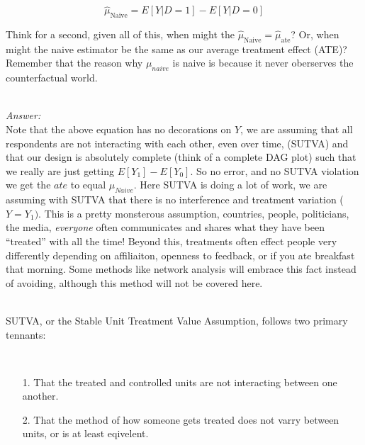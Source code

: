 \documentclass[12pt]{article}\usepackage[]{graphicx}\usepackage[]{color}
\begin{document}
\begin{flushleft}
\begin{equation}
\hat{\mu}_\text{Naive} = E[Y|D=1] - E[Y|D=0]
\end{equation}


Think for a second, given all of this, when might the $\hat{\mu}_\text{Naive} = \hat{\mu}_\text{ate}$? Or, when might the naive estimator be the same as our average treatment effect (ATE)? Remember that the reason why $\mu_{naive}$ is naive is because it never oberserves the counterfactual world.

\hfill \\

\noindent \textit{Answer:}\\

Note that the above equation has no decorations on $Y$, we are assuming that all respondents are not interacting with each other, even over time, (SUTVA) and that our design is absolutely complete (think of a complete DAG plot) such that we really are just getting $ E[Y_1] - E[Y_0]$. So no error, and no SUTVA violation we get the $ate$ to equal $\mu_{Naive}$.  Here SUTVA is doing a lot of work, we are assuming with SUTVA that there is no interference and treatment variation ($ Y = Y_1)$. This is a pretty monsterous assumption, countries, people, politicians, the media, \textit{everyone} often communicates and shares what they have been ``treated'' with all the time! Beyond this, treatments often effect people very differently depending on affiliaiton, openness to feedback, or if you ate breakfast that morning. Some methods like network analysis will embrace this fact instead of avoiding, although this method will not be covered here.

\hfill \\

\noindent SUTVA, or the Stable Unit Treatment Value Assumption, follows two primary tennants:

\hfill \\

\begin{itemize}
\item[1.] That the treated and controlled units are not interacting between one another.
\item[2.] That the method of how someone gets treated does not varry between units, or is at least eqivelent.
\end{itemize}

\hfill \\


\end{flushleft}
\end{document}
